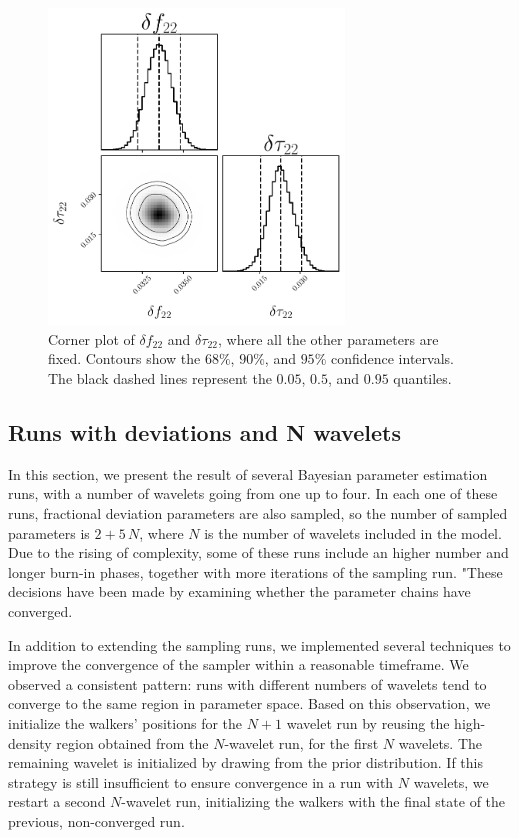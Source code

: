 \begin{figure}[h!]
    \centering
    \includegraphics[width=0.7\textwidth]{Images/Corner_dev.pdf}
    \caption{Corner plot of $\delta f_{22}$ and $\delta \tau_{22}$, where all the other parameters are fixed. Contours show the $68\%$, $90\%$, and $95\%$ confidence intervals. The black dashed lines represent the $0.05$, $0.5$, and $0.95$ quantiles.}
    \label{fig:Corner_dev}
\end{figure}




\subsection{Runs with deviations and N wavelets}

In this section, we present the result of several Bayesian parameter estimation runs, with a number of wavelets going from one up to four. In each one of these runs, fractional deviation parameters are also sampled, so the number of sampled parameters is $ 2 + 5 \, N $, where $N$ is the number of wavelets included in the model. Due to the rising of complexity, some of these runs include an higher number and longer burn-in phases, together with more iterations of the sampling run. "These decisions have been made by examining whether the parameter chains have converged.

In addition to extending the sampling runs, we implemented several techniques to improve the convergence of the sampler within a reasonable timeframe. We observed a consistent pattern: runs with different numbers of wavelets tend to converge to the same region in parameter space. Based on this observation, we initialize the walkers' positions for the $N+1$ wavelet run by reusing the high-density region obtained from the $N$-wavelet run, for the first $N$ wavelets. The remaining wavelet is initialized by drawing from the prior distribution. If this strategy is still insufficient to ensure convergence in a run with $N$ wavelets, we restart a second $N$-wavelet run, initializing the walkers with the final state of the previous, non-converged run.



